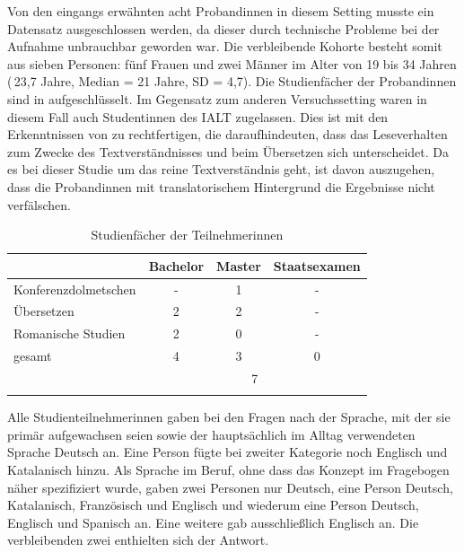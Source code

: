 Von den eingangs erwähnten acht Proband{\textperiodcentered}innen in diesem Setting musste ein Datensatz ausgeschlossen werden, da dieser durch technische Probleme bei der Aufnahme unbrauchbar geworden war. Die verbleibende Kohorte besteht somit aus sieben Personen: fünf Frauen und zwei Männer im Alter von 19 bis 34 Jahren (\diameter\,23,7 Jahre, Median = 21 Jahre, SD = 4,7). Die Studienfächer der Proband{\textperiodcentered}innen sind in  aufgeschlüsselt. Im Gegensatz zum anderen Versuchssetting waren in diesem Fall auch Student{\textperiodcentered}innen des IALT zugelassen. Dies ist mit den Erkenntnissen von \citet[]{jakobsen_reading_2017} zu rechtfertigen, die daraufhindeuten, dass das Leseverhalten zum Zwecke des Textverständnisses und beim Übersetzen sich unterscheidet. Da es bei dieser Studie um das reine Textverständnis geht, ist davon auszugehen, dass die Proband{\textperiodcentered}innen mit translatorischem Hintergrund die Ergebnisse nicht verfälschen.



\begin{table}
 \begin{tabular}{lccc}
 \lsptoprule
        & {Bachelor} & {Master} & {Staatsexamen}\\ 
        \midrule
  Konferenzdolmetschen & - & 1 & - \\ 
  Übersetzen & 2 & 2 & -\\ 
  Romanische Studien & 2 & 0 & -\\   \midrule
  {gesamt} & 4 & 3 & 0\\  \cmidrule(lr){2-4}
   & \multicolumn{3}{c}{7} \\ 
   \lspbottomrule
 \end{tabular}
 \caption{Studienfächer der Teilnehmer{\textperiodcentered}innen\label{K6:tab:TN-Feldstudie-DeDe}}
\end{table}



Alle Studienteilnehmer{\textperiodcentered}innen gaben bei den Fragen nach der Sprache, mit der sie primär aufgewachsen seien sowie der hauptsächlich im Alltag verwendeten Sprache Deutsch an. Eine Person fügte bei zweiter Kategorie noch Englisch und Katalanisch hinzu. Als Sprache im Beruf, ohne dass das Konzept im Fragebogen näher spezifiziert wurde, gaben zwei Personen nur Deutsch, eine Person Deutsch, Katalanisch, Französisch und Englisch und wiederum eine Person Deutsch, Englisch und Spanisch an. Eine weitere gab ausschließlich Englisch an. Die verbleibenden zwei enthielten sich der Antwort.

